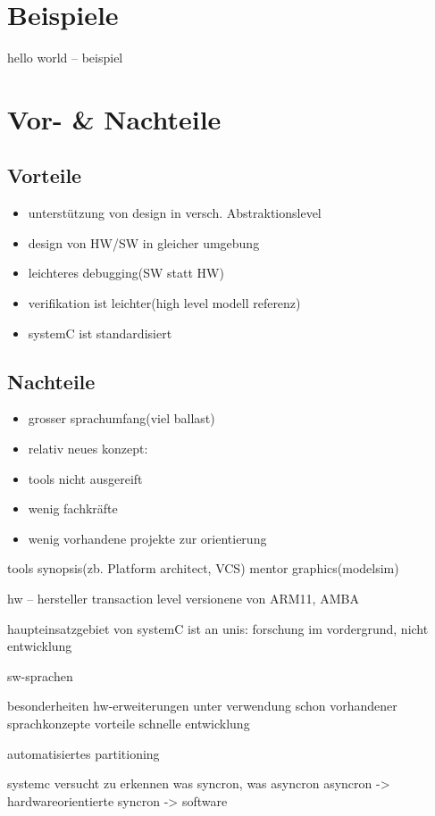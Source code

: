 \section{Beispiele}

	hello world – beispiel
	

\section{Vor- \& Nachteile}
\subsection{Vorteile}
\begin{itemize}
 \item unterstützung von design in versch. Abstraktionslevel
 \item design von HW/SW in gleicher umgebung
 \item leichteres debugging(SW statt HW)
 \item verifikation ist leichter(high level modell referenz)
 \item systemC ist standardisiert
\end{itemize}

\subsection{Nachteile}
\begin{itemize}
 \item grosser sprachumfang(viel ballast)
 \item relativ neues konzept:
 \item tools nicht ausgereift
 \item wenig fachkräfte
 \item wenig vorhandene projekte zur orientierung
\end{itemize}

	tools
synopsis(zb. Platform architect, VCS)
mentor graphics(modelsim)
	
	hw – hersteller
transaction level versionene von ARM11, AMBA

	haupteinsatzgebiet von systemC ist an unis: forschung im vordergrund, nicht entwicklung
	
sw-sprachen

	besonderheiten
		hw-erweiterungen unter verwendung schon vorhandener sprachkonzepte
	vorteile
		schnelle entwicklung

	automatisiertes partitioning

	systemc versucht zu erkennen was syncron, was asyncron
		asyncron -> hardwareorientierte
		syncron -> software 
